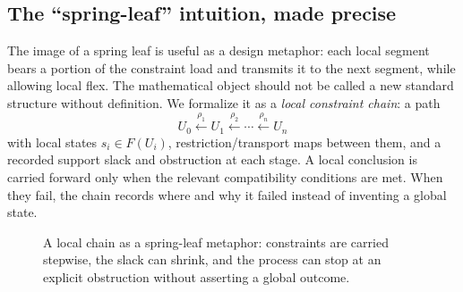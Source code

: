 \documentclass[11pt]{article}
\newcommand{\slack}{\operatorname{slack}}
\begin{document}
\subsection{The ``spring-leaf'' intuition, made precise}

The image of a spring leaf is useful as a design metaphor: each local segment bears a portion of the constraint load and transmits it to the next segment, while allowing local flex. The mathematical object should not be called a new standard structure without definition. We formalize it as a \emph{local constraint chain}: a path
\[
  U_0\xleftarrow{\rho_1}U_1\xleftarrow{\rho_2}\cdots
  \xleftarrow{\rho_n}U_n
\]
with local states $s_i\in F(U_i)$, restriction/transport maps between them, and a recorded support slack and obstruction at each stage. A local conclusion is carried forward only when the relevant compatibility conditions are met. When they fail, the chain records where and why it failed instead of inventing a global state.

\begin{figure}[ht]
\centering
{}
\caption{A local chain as a spring-leaf metaphor: constraints are carried stepwise, the slack can shrink, and the process can stop at an explicit obstruction without asserting a global outcome.}
\label{fig:chain}
\end{figure}
\end{document}
